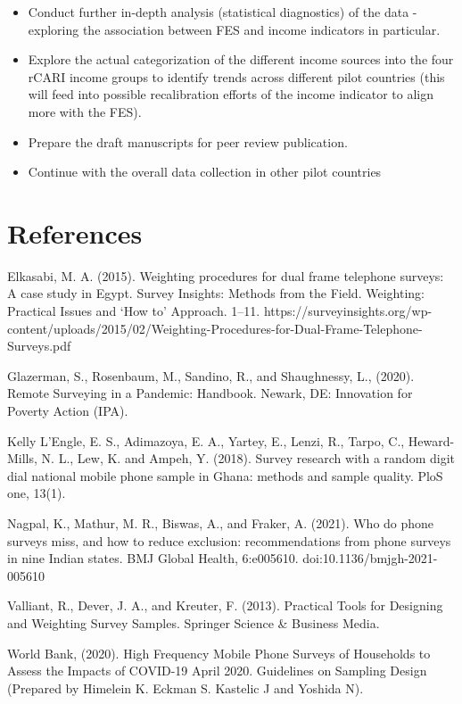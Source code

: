 \documentclass[11pt,harvard]{article}
\begin{document}
\begin{itemize}[label=--, left=2.5em]
	\item[1.] Conduct further in-depth analysis (statistical diagnostics)  of the data - exploring the association between FES and income indicators in particular.
	\item[2.] Explore the actual categorization of the different income sources into the four rCARI income groups to identify trends across different pilot countries (this will feed into possible recalibration efforts of the income indicator to align more with the FES).
	\item[3.] Prepare the draft manuscripts for  peer review publication.	
	\item[4.] Continue with the overall data collection in other pilot countries
\end{itemize} 


\pagebreak


\section{References}
	
Elkasabi, M. A. (2015). Weighting procedures for dual frame telephone surveys: A case study in Egypt. Survey Insights: Methods from the Field. Weighting: Practical Issues and ‘How to’ Approach. 1–11. https://surveyinsights.org/wp-content/uploads/2015/02/Weighting-Procedures-for-Dual-Frame-Telephone-Surveys.pdf
	
Glazerman, S., Rosenbaum, M., Sandino, R., and Shaughnessy, L., (2020). Remote Surveying in a Pandemic: Handbook. Newark, DE: Innovation for Poverty Action (IPA).
	
Kelly L’Engle, E. S., Adimazoya, E. A., Yartey, E., Lenzi, R., Tarpo, C., Heward-Mills, N. L., Lew, K. and Ampeh, Y. (2018). Survey research with a random digit dial national mobile phone sample in Ghana: methods and sample quality. PloS one, 13(1).
	
Nagpal, K., Mathur, M. R., Biswas, A., and Fraker, A. (2021). Who do phone surveys miss, and how to reduce exclusion: recommendations from phone surveys in nine Indian states. BMJ Global Health, 6:e005610. doi:10.1136/bmjgh-2021-005610

Valliant, R., Dever, J. A., and Kreuter, F. (2013). Practical Tools for Designing and Weighting Survey Samples. Springer Science \& Business Media.
	
World Bank, (2020). High Frequency Mobile Phone Surveys of Households to Assess the Impacts of COVID-19 April 2020. Guidelines on Sampling Design (Prepared by Himelein K. Eckman S. Kastelic J and Yoshida N).
\end{document}
